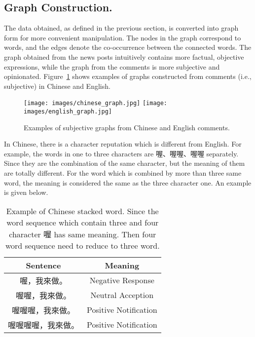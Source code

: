 \documentclass[12pt,a4paper]{report}
\theoremstyle{definition}
\begin{document}
\begin{CJK}{UTF8}{bsmi}
    \subsection{Graph Construction.}
    The data obtained, as defined in the previous section, is converted into graph form for more convenient manipulation. The nodes in the graph correspond to words, and the edges denote the co-occurrence between the connected words. The graph obtained from the news posts intuitively contains more factual, objective expressions, while the graph from the comments is more subjective and opinionated. Figure~\ref{fig:subj_graphs} shows examples of graphs constructed from comments (i.e., subjective) in Chinese and English.
    \begin{figure}[H]
        \centering
        \texttt{[image: images/chinese\_graph.jpg]}
        \texttt{[image: images/english\_graph.jpg]}
        \caption{Examples of subjective graphs from Chinese and English comments.}
        \label{fig:subj_graphs}
    \end{figure}
    \begin{CJK}{UTF8}{bsmi}
    In Chinese, there is a character reputation which is different from English. For example, the words in one to three characters are 喔、喔喔、喔喔 separately. Since they are the combination of the same character, but the meaning of them are totally different. For the word which is combined by more than three same word, the meaning is considered the same as the three character one. An example is given below.
    \newline
    \begin{CJK}{UTF8}{bsmi}
    \begin{table}[H]
    \centering
    \begin{tabular}{|c|c|}
        \hline
            Sentence & Meaning \\
            \hline
            喔，我來做。& Negative Response \\
            \hline
            喔喔，我來做。& Neutral Acception \\
            \hline
            喔喔喔，我來做。& Positive Notification \\
            \hline
            喔喔喔喔，我來做。& Positive Notification \\
            \hline
    \end{tabular}
    \caption{Example of Chinese stacked word. Since the word sequence which contain three and four character 喔 has same meaning. Then four word sequence need to reduce to three word. }

\end{table}
\end{CJK}
\end{CJK}
\end{CJK}
\end{document}
